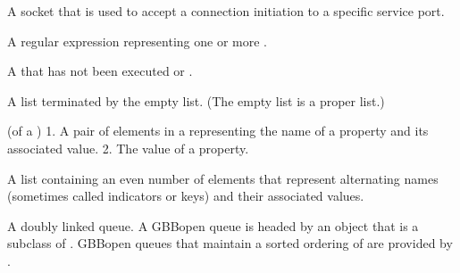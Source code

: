 \documentclass[10pt,twoside,english,pdftex]{article}
\begin{document}
\begin{glossary-list}

%
A socket that is used to accept a connection initiation to a specific service
port.


%
%
%
A regular expression representing one or more .


%
%
%
%
%
A  that has not been executed or .


%
%
A list terminated by the empty list. (The empty list is a proper list.)


\glent[property]
%
(of a ) 1. A pair of elements in a 
representing the name of a property and its associated value. 2. The value of
a property.


%
%
A list containing an even number of elements that represent alternating names
(sometimes called indicators or keys) and their associated values.


\glent[queue]
%
%
A doubly linked queue.  A GBBopen queue is headed by an object that is a
subclass of \textbf{}.  GBBopen queues that maintain a
sorted ordering of  are provided by
.



\end{glossary-list}
\end{document}
